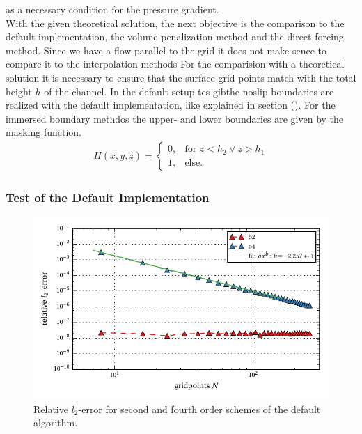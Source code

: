 as a necessary condition for the pressure gradient.\\
With the given theoretical solution, the next objective is the comparison
to the default implementation, the volume penalization method and the direct forcing method.
Since we have a flow parallel to the grid  it does not make sence to compare it to the interpolation methods
For the comparision with a theoretical solution it is necessary to ensure that the surface grid points match with the total height $h$ of the channel.
In the default setup tes gibthe noslip-boundaries are realized with the default implementation, like explained in section ().
For the immersed boundary methdos the upper- and lower boundaries are given by the masking function.
\begin{align}
H(x, y, z) = \begin{cases}
                    0, & \text{for \  }  z < h_2 \lor z>h_1 \\
                    1, & \text{else}.
             \end{cases}
\end{align}

\subsubsection{Test of the Default Implementation}

\begin{figure}[!bp]
    \centering
    \includegraphics{gfx/immersed_boundary/poiseuille_flow/1_default/relative_l2error.pdf}
    \caption{Relative $l_2$-error for second and fourth order schemes of the default algorithm.\label{fig:ema1}}
\end{figure}

